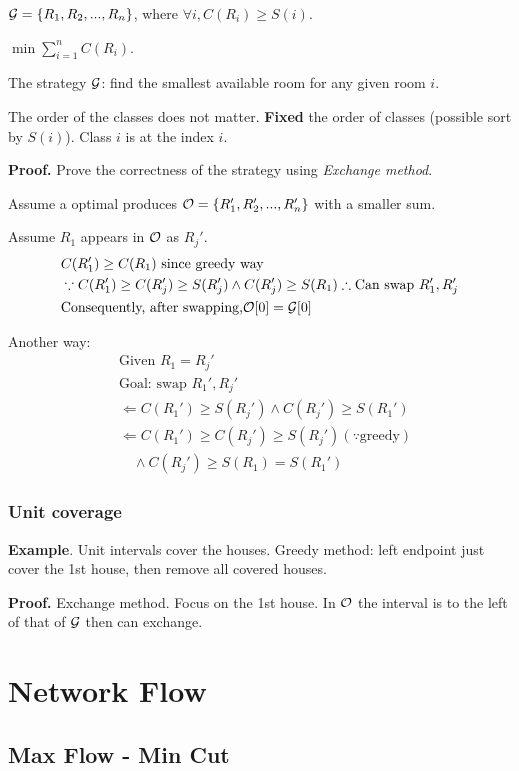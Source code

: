 \documentclass[a4paper]{report}
\theoremstyle{definition}
\begin{document}
$\mathcal{G}=\{R_1,R_2, ..., R_n\}$, where $\forall i, C(R_i)\geq S(i)$.

$\min \sum_{i=1}^n C(R_i)$.

The strategy $\mathcal{G}$: find the smallest available room for any given room $i$.

The order of the classes does not matter. \textbf{Fixed} the order of classes (possible sort by $S(i)$). Class $i$ is at the index $i$. 

\textbf{Proof.} Prove the correctness of the strategy using \textit{Exchange method}. 

Assume a optimal produces $\mathcal{O}=\{R_1', R_2', ..., R_n'\}$ with a smaller sum.

Assume $R_1$ appears in $\mathcal{O}$ as $R_j'$.
\begin{align*}
& C(R'_1)\geq C(R_1) \text{ since greedy way}\\
& \because C(R'_1)\geq C(R_j') \geq S(R_j') \wedge C(R_j')\geq S(R_1) \therefore \text{Can swap } R_1',  R_j'\\
& \text{Consequently, after swapping,}  \mathcal{O}[0]=\mathcal{G}[0]
\end{align*}

Another way:
\begin{align*}
& \text{Given } R_1 = R_j' \\
& \text{Goal: swap } R_1', R_j' \\
& \Leftarrow C(R_1') \geq S(R_j') \wedge C(R_j') \geq S(R_1') \\
& \Leftarrow C(R_1') \geq C(R_j') \geq S(R_j') (\because \text{greedy}) \\
& \quad \wedge C(R_j') \geq S(R_1) = S(R_1')
\end{align*}


\subsection{Unit coverage}
\textbf{Example}.
Unit intervals cover the houses. Greedy method: left endpoint just cover the 1st house, then remove all covered houses.

\textbf{Proof.} Exchange method. Focus on the 1st house. In $\mathcal{O}$ the interval is to the left of that of $\mathcal{G}$ then can exchange.

\chapter{Network Flow}
\section{Max Flow - Min Cut}
\end{document}
